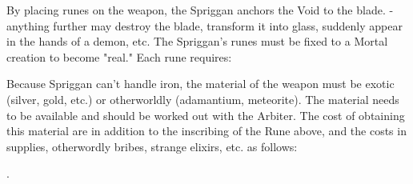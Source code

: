 By placing runes on the weapon, the Spriggan anchors the Void to the blade.  - anything further may destroy the blade, transform it into glass, suddenly appear in the hands of a demon, etc.  The Spriggan's runes must be fixed to a Mortal creation to become "real." Each rune requires:


Because Spriggan can't handle iron, the material of the weapon must be exotic (silver, gold, etc.) or otherworldly (adamantium, meteorite).  The material needs to be available and should be worked out with the Arbiter. The cost of obtaining this material are in addition to the inscribing of the Rune above, and the costs in supplies, otherwordly bribes, strange elixirs, etc. as follows:


.


\newpage

